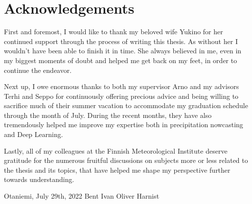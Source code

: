 \documentclass[12pt,a4paper,oneside,pdftex]{report}
\newcommand{\DATE}{July 29th, 2022}
\newcommand{\AUTHOR}{Bent Ivan Oliver Harnist}
\begin{document}
\chapter*{Acknowledgements}

First and foremost, I would like to thank my beloved wife Yukino for her continued support through the process of writing this thesis. As without her I wouldn't have been able to finish it in time. She always believed in me, even in my biggest moments of doubt and helped me get back on my feet, in order to continue the endeavor. 

Next up, I owe enormous thanks to both my supervisor Arno and my advisors Terhi and Seppo for continuously offering precious advice and being willing to sacrifice much of their summer vacation to accommodate my graduation schedule through the month of July. During the recent months, they have also tremendously helped me improve my expertise both in precipitation nowcasting and Deep Learning. 

Lastly, all of my colleagues at the Finnish Meteorological Institute deserve gratitude for the numerous fruitful discussions on subjects more or less related to the thesis and its topics, that have helped me shape my perspective further towards understanding. 


\vskip 10mm

\noindent Otaniemi, \DATE
\vskip 5mm
\noindent\AUTHOR

\cleardoublepage


\cleardoublepage
\tableofcontents

\end{document}
